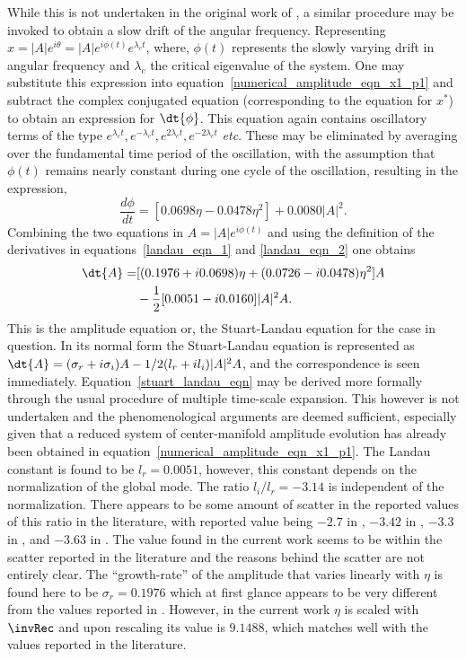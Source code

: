 While this is not undertaken in the original work of \cite{landau_52}, a similar procedure may be invoked to obtain a slow drift of the angular frequency. Representing $x = |A|e^{i\theta} = |A|e^{i\phi(t)}e^{\lambda_{c}t}$, where, $\phi(t)$ represents the slowly varying drift in angular frequency and $\lambda_{c}$ the critical eigenvalue of the system. One may substitute this expression into equation~\eqref{numerical_amplitude_eqn_x1_p1} and subtract the complex conjugated equation (corresponding to the equation for $x^{*}$) to obtain an expression for $\dt{\phi}$. This equation again contains oscillatory terms of the type $e^{\lambda_{c}t},e^{-\lambda_{c}t},e^{2\lambda_{c}t},e^{-2\lambda_{c}t}$ \textit{etc}. These may be eliminated by averaging over the fundamental time period of the oscillation, with the assumption that $\phi(t)$ remains nearly constant during one cycle of the oscillation, resulting in the expression,
\begin{equation}
	\label{landau_eqn_2}
	\dfrac{d\phi}{dt} = [0.0698\eta - 0.0478\eta^{2}]  + 0.0080|A|^{2}.
\end{equation}
Combining the two equations in $A = |A|e^{i\phi(t)}$ and using the definition of the derivatives in equations~\eqref{landau_eqn_1} and \eqref{landau_eqn_2} one obtains
\begin{eqnarray}
	\label{stuart_landau_eqn}
	\begin{split}
		\dt{A} 					=& [(0.1976 + i0.0698)\eta + (0.0726 - i0.0478)\eta^{2}] A \\
										& - \frac{1}{2}[0.0051 - i0.0160]|A|^{2}A.
	\end{split}
\end{eqnarray}
This is the amplitude equation or, the Stuart-Landau equation for the case in question. In its normal form the Stuart-Landau equation is represented as $\dt{A} = (\sigma_{r} + i\sigma_{i})A - 1/2(l_{r} + il_{i})|A|^{2}A$, and the correspondence is seen immediately. Equation~\eqref{stuart_landau_eqn} may be derived more formally through the usual procedure of multiple time-scale expansion. This however is not undertaken and the phenomenological arguments are deemed sufficient, especially given that a reduced system of center-manifold amplitude evolution has already been obtained in equation~\eqref{numerical_amplitude_eqn_x1_p1}. The Landau constant is found to be $l_{r} = 0.0051$, however, this constant depends on the normalization of the global mode. The ratio $l_{i}/l_{r} = -3.14$ is independent of the normalization. There appears to be some amount of scatter in the reported values of this ratio in the literature, with reported value being $-2.7$  in \cite{dusek94}, $-3.42$ in \cite{sipp07}, $-3.3$ in \cite{meliga12}, and $-3.63$ in \cite{carini15}. The value found in the current work seems to be within the scatter reported in the literature and the reasons behind the scatter are not entirely clear. The ``growth-rate'' of the amplitude that varies linearly with $\eta$ is found here to be $\sigma_{r}=0.1976$ which at first glance appears to be very different from the values reported in \cite{sipp07,meliga12,carini15}. However, in the current work $\eta$ is scaled with $\invRec$  and upon rescaling its value is $9.1488$, which matches well with the values reported in the literature.



